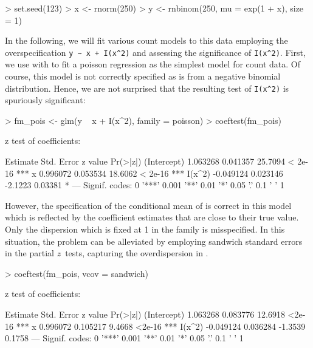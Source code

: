 \documentclass{Z}
\begin{document}
\begin{Schunk}
\begin{Sinput}
> set.seed(123)
> x <- rnorm(250)
> y <- rnbinom(250, mu = exp(1 + x), size = 1)
\end{Sinput}
\end{Schunk}

In the following, we will fit various count models to this data employing
the overspecification \verb/y ~ x + I(x^2)/ and assessing the significance
of \verb/I(x^2)/. First, we use  with 
to fit a poisson regression as the simplest model for count data.
Of course, this model is not correctly specified as  is from a 
negative binomial distribution. Hence, we are not surprised that the 
resulting test of \verb/I(x^2)/ is spuriously significant:

\begin{Schunk}
\begin{Sinput}
> fm_pois <- glm(y ~ x + I(x^2), family = poisson)
> coeftest(fm_pois)
\end{Sinput}
\begin{Soutput}
z test of coefficients:

             Estimate Std. Error z value Pr(>|z|)    
(Intercept)  1.063268   0.041357 25.7094  < 2e-16 ***
x            0.996072   0.053534 18.6062  < 2e-16 ***
I(x^2)      -0.049124   0.023146 -2.1223  0.03381 *  
---
Signif. codes:  0 '***' 0.001 '**' 0.01 '*' 0.05 '.' 0.1 ' ' 1 
\end{Soutput}
\end{Schunk}

However, the specification of the conditional mean of  is correct
in this model which is reflected by the coefficient estimates that are close to 
their true value. Only the dispersion which is fixed at 1 in the 
family is misspecified. In this situation, the problem can be alleviated 
by employing sandwich standard errors in the partial $z$~tests, capturing
the overdispersion in .

\begin{Schunk}
\begin{Sinput}
> coeftest(fm_pois, vcov = sandwich)
\end{Sinput}
\begin{Soutput}
z test of coefficients:

             Estimate Std. Error z value Pr(>|z|)    
(Intercept)  1.063268   0.083776 12.6918   <2e-16 ***
x            0.996072   0.105217  9.4668   <2e-16 ***
I(x^2)      -0.049124   0.036284 -1.3539   0.1758    
---
Signif. codes:  0 '***' 0.001 '**' 0.01 '*' 0.05 '.' 0.1 ' ' 1 
\end{Soutput}
\end{Schunk}
\end{document}
